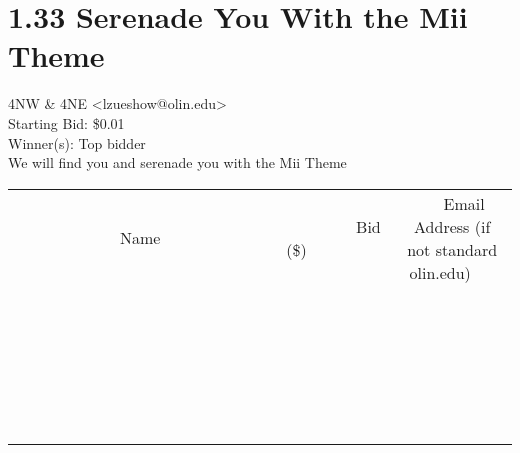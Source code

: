 \documentclass[11pt]{article}
\begin{document}
					\section*{1.33 Serenade You With the Mii Theme}
					4NW \& 4NE <lzueshow@olin.edu> \\
					Starting Bid: \$0.01 \\
					Winner(s): Top bidder \\
					We will find you and serenade you with the Mii Theme \\
					[6ex]
					\begin{tabular}{c c c}
						~~~~~~~~~~~~~Name~~~~~~~~~~~~~ & ~~~~~~~~~Bid (\$)~~~~~~~~~ & ~~~Email Address (if not standard olin.edu)~~~ \\
				
 & & \\
\hline
 & & \\
\hline
 & & \\
\hline
 & & \\
\hline
 & & \\
\hline
 & & \\
\hline
 & & \\
\hline
 & & \\
\hline
 & & \\
\hline
 & & \\
\hline
 & & \\
\hline
 & & \\
\hline
 & & \\
\hline
 & & \\
\hline
 & & \\
\hline
 & & \\
\hline
 & & \\
\hline
 & & \\
\hline
 & & \\
\hline
 & & \\
\hline
 & & \\
\hline
 & & \\
\hline
 & & \\
\hline
 & & \\
\hline
 & & \\
\hline
 & & \\
\hline
					\end{tabular}
					\clearpage
				
\end{document}
